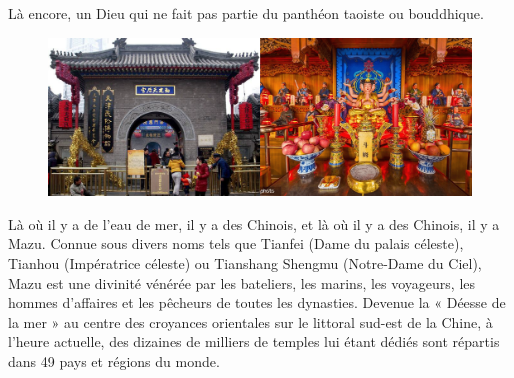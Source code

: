 \begin{Ex}
Là encore, un Dieu qui ne fait pas partie du panthéon taoiste ou bouddhique.
        \begin{figure}[!h]
        \centering
                \includegraphics[width=1\textwidth]{ConfucianismeTaoismeBouddhismeChinois/Images/TempleDeesseMaritimeTianjin.png}

        

        \label{fig:enter-label}
    \end{figure}
Là où il y a de l'eau de mer, il y a des Chinois, et là où il y a des Chinois, il y a Mazu.
Connue sous divers noms tels que Tianfei (Dame du palais céleste), Tianhou (Impératrice céleste) ou Tianshang Shengmu (Notre-Dame du Ciel), Mazu est une divinité vénérée par les bateliers, les marins, les voyageurs, les hommes d'affaires et les pêcheurs de toutes les dynasties. Devenue la « Déesse de la mer » au centre des croyances orientales sur le littoral sud-est de la Chine, à l'heure actuelle, des dizaines de milliers de temples lui étant dédiés sont répartis dans 49 pays et régions du monde.
\end{Ex}
